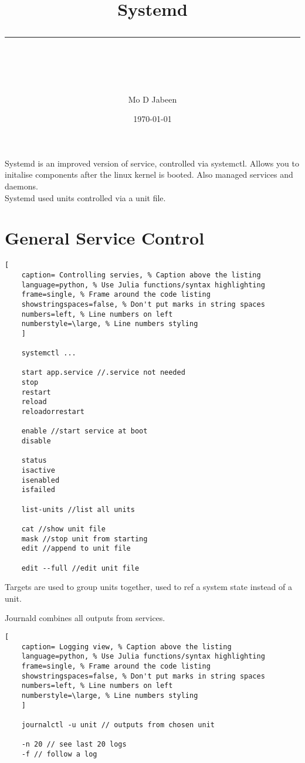 \documentclass[11pt]{scrartcl} %
\title{	
	\normalfont\normalsize
	\vspace{20pt} %
	{\huge Systemd}\\ %
	\vspace{12pt} %
	\rule{\linewidth}{2pt}\\ %
}
\author{\small Mo D Jabeen} %
\date{\normalsize\today} %
\begin{document}
\maketitle %

Systemd is an improved version of service, controlled via systemctl. Allows you to initalise
components after the linux kernel is booted. Also managed services and daemons.\\

Systemd used units controlled via a unit file.

\section{General Service Control}

\begin{lstlisting}[
	caption= Controlling servies, % Caption above the listing
	language=python, % Use Julia functions/syntax highlighting
	frame=single, % Frame around the code listing
	showstringspaces=false, % Don't put marks in string spaces
	numbers=left, % Line numbers on left
	numberstyle=\large, % Line numbers styling
	]

	systemctl ...

	start app.service //.service not needed
	stop
	restart
	reload
	reloadorrestart

	enable //start service at boot
	disable

	status
	isactive
	isenabled
	isfailed

	list-units //list all units

	cat //show unit file
	mask //stop unit from starting
	edit //append to unit file

	edit --full //edit unit file

\end{lstlisting}

Targets are used to group units together, used to ref a system state instead of a unit. 

Journald combines all outputs from services.

\begin{lstlisting}[
	caption= Logging view, % Caption above the listing
	language=python, % Use Julia functions/syntax highlighting
	frame=single, % Frame around the code listing
	showstringspaces=false, % Don't put marks in string spaces
	numbers=left, % Line numbers on left
	numberstyle=\large, % Line numbers styling
	]

	journalctl -u unit // outputs from chosen unit

	-n 20 // see last 20 logs
	-f // follow a log 

\end{lstlisting}
\end{document}
